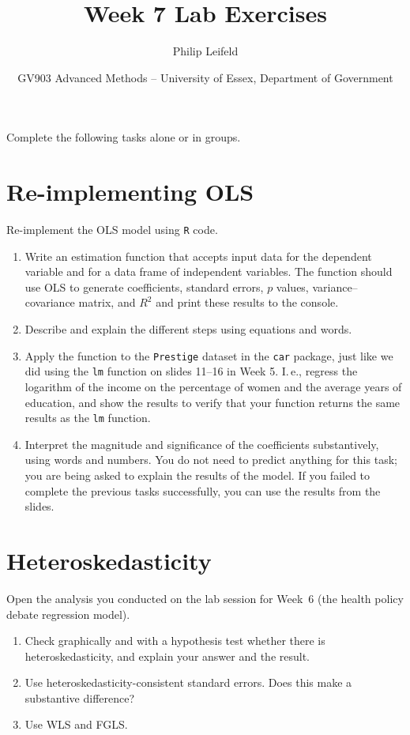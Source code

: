\documentclass[a4paper,11pt]{article}
\title{Week 7 Lab Exercises}
\author{Philip Leifeld}
\date{GV903 Advanced Methods -- University of Essex, Department of Government}
\begin{document}
\maketitle

\noindent Complete the following tasks alone or in groups.


\section{Re-implementing OLS}

Re-implement the OLS model using \texttt{R} code.

\begin{enumerate}
\item Write an estimation function that accepts input data for the dependent variable and for a data frame of independent variables. The function should use OLS to generate coefficients, standard errors, $p$ values, variance--covariance matrix, and $R^2$ and print these results to the console.
\item Describe and explain the different steps using equations and words.
\item Apply the function to the \texttt{Prestige} dataset in the \texttt{car} package, just like we did using the \texttt{lm} function on slides 11--16 in Week 5. I.\,e., regress the logarithm of the income on the percentage of women and the average years of education, and show the results to verify that your function returns the same results as the \texttt{lm} function.
\item Interpret the magnitude and significance of the coefficients substantively, using words and numbers. You do not need to predict anything for this task; you are being asked to explain the results of the model. If you failed to complete the previous tasks successfully, you can use the results from the slides.
\end{enumerate}

\section{Heteroskedasticity}
Open the analysis you conducted on the lab session for Week~6 (the health policy debate regression model).
\begin{enumerate}
 \item Check graphically and with a hypothesis test whether there is heteroskedasticity, and explain your answer and the result.
 \item Use heteroskedasticity-consistent standard errors. Does this make a substantive difference?
 \item Use WLS and FGLS.
\end{enumerate}
\end{document}
